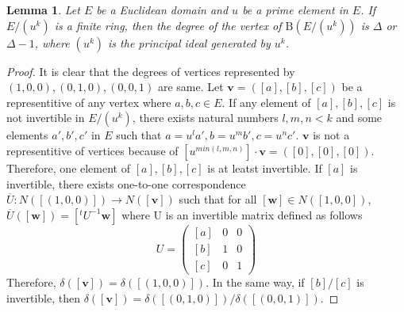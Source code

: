 \documentclass{article}
\newtheorem{Lem}{Lemma}
\newtheorem{Cor}[Lem]{Corollary}
\newcommand{\B}{\mathrm{B}}
\begin{document}
\iffalse

\begin{Lem}
Let $R_1, R_2$ be rings with unit. 
\[ \B(R_1 \times R_2) \simeq \B(R_1) \otimes \B(R_2) \]
\end{Lem}

\begin{Cor}
The followig equations hold.
\begin{enumerate}
\item $ | \B(R_1 \times R_2) | = | \B(R_1) | \times | \B(R_2) | $
\item $ \Delta(\B(R_1 \times R_2)) = \Delta(\B(R_1)) \times \Delta( \B(R_2) )$
\end{enumerate}
\end{Cor}

\fi 

\begin{Lem}\label{Lem:regular}
Let $E$ be a Euclidean domain and $u$ be a prime element in $E$. 
If $E/(u^k)$ is a finite ring, then the degree of the vertex of $\B(E/(u^k))$ is $\Delta$ or $\Delta-1$, 
where $(u^k)$ is the principal ideal generated by $u^k$. 
\end{Lem}

\begin{proof}
It is clear that the degrees of vertices represented by $(1,0,0), (0,1,0), (0,0,1)$ are same.
Let ${\bm v} = ([a],[b],[c])$ be a representitive of any vertex where $a,b,c \in E$. 
If any element of $[a],[b],[c]$ is not invertible in $E/(u^k)$, 
there exists natural numbers $l,m,n < k$ and some elements $a',b',c'$ in $E$ such that $a=u^l a', b=u^m b', c=u^n c'$. ${\bm v}$ is not a representitive of vertices because of $[u^{min(l,m,n)}] \cdot {\bm v} = ([0],[0],[0])$. 
Therefore, one element of $[a],[b],[c]$ is at leatst invertible.
If $[a]$ is invertible, there exists one-to-one correspondence $\overline{U}: N([(1,0,0)])  \rightarrow N([{\bm v}])$ such that for all $[{\bm w}] \in N([1,0,0])$, $\overline{U}([\bm w]) = [ {}^t\!U^{-1} {\bm w} ]$ where U is an invertible matrix defined as follows
\[
 U = \left(
 \begin{matrix}
  [a] & 0 & 0 \\
  [b] & 1 & 0 \\
  [c] & 0 & 1
 \end{matrix} \right)
\]
Therefore, $\delta([\bm v]) = \delta([(1,0,0)])$. In the same way, if $[b]/[c]$ is invertible, then $\delta([\bm v]) = \delta([(0,1,0)])/\delta([(0,0,1)])$. 

\end{proof}
\end{document}
